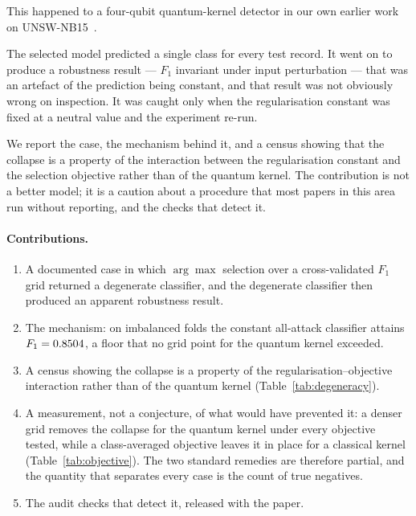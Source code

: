 \documentclass[runningheads]{llncs}
\newif\ifanonymous
\newcommand{\Fone}{F_1}
\begin{document}
\ifanonymous
This happened to a four-qubit quantum-kernel detector in an earlier
study~\cite{companion} on UNSW-NB15~\cite{moustafa2015unsw}.
\else
This happened to a four-qubit quantum-kernel detector in our own earlier
work~\cite{companion} on UNSW-NB15~\cite{moustafa2015unsw}.
\fi
The selected model predicted a single class for every
test record. It went on to produce a robustness result --- $\Fone$ invariant
under input perturbation --- that was an artefact of the prediction being
constant, and that result was not obviously wrong on inspection. It was
caught only when the regularisation constant was fixed at a neutral value
and the experiment re-run.

We report the case, the mechanism behind it, and a census showing that the
collapse is a property of the interaction between the regularisation
constant and the selection objective rather than of the quantum kernel. The
contribution is not a better model; it is a caution about a procedure that
most papers in this area run without reporting, and the checks that detect
it.

\paragraph{Contributions.}
\begin{enumerate}
  \item A documented case in which $\arg\max$ selection over a
        cross-validated $\Fone$ grid returned a degenerate classifier, and the
        degenerate classifier then produced an apparent robustness result.
  \item The mechanism: on imbalanced folds the constant all-attack classifier
        attains $\Fone = \pdegFloor$, a floor that no grid point for the
        quantum kernel exceeded.
  \item A census showing the collapse is a property of the
        regularisation--objective interaction rather than of the quantum
        kernel (Table~\ref{tab:degeneracy}).
  \item A measurement, not a conjecture, of what would have prevented it:
        a denser grid removes the collapse for the quantum kernel under
        every objective tested, while a class-averaged objective leaves it
        in place for a classical kernel (Table~\ref{tab:objective}). The
        two standard remedies are therefore partial, and the quantity that
        separates every case is the count of true negatives.
  \item The audit checks that detect it, released with the paper.
\end{enumerate}
\end{document}
